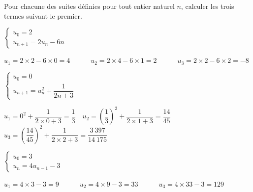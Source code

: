 \documentclass[12pt,a4paper]{article}  %
\begin{document}
Pour chacune des suites définies pour tout entier naturel $n$, calculer les trois termes suivant le premier.
\begin{enumMet}
    \item $\left\{\begin{array}{l}u_{0}=2 \\ u_{n+1}=2u_{n}-6 n\end{array}\right.$\\
    \begin{corrBox}
        $u_1=2\times2-6\times0=4\quad\quad\quad u_2=2\times4-6\times1=2\quad\quad\quad u_3=2\times2-6\times2=-8$
    \end{corrBox}
    \item $\left\{\begin{array}{l}u_{0}=0 \\ u_{n+1}=u_{n}^{2}+\dfrac{1}{2 n+3}\end{array}\right.$\\
    \begin{corrBox}
        $u_1=0^2+\dfrac{1}{2\times0+3}=\dfrac{1}{3}\quad u_2=\left(\dfrac{1}{3}\right)^2+\dfrac{1}{2\times1+3}=\dfrac{14}{45}$\\
        $u_3=\left(\dfrac{14}{45}\right)^2+\dfrac{1}{2\times2+3}=\dfrac{3\ 397}{14\ 175}$
    \end{corrBox}
    \item {} $\left\{\begin{array}{l}u_{0}=3 \\ u_{n}=4 u_{n-1}-3\end{array}\right.$\\
    \begin{corrBox}
        $u_1=4\times3-3=9\quad\quad\quad u_2=4\times9-3=33\quad\quad\quad u_3=4\times33-3=129$
    \end{corrBox}
\end{enumMet}
\end{document}
